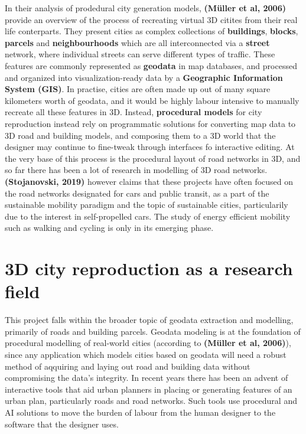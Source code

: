 \documentclass{kththesis}
\begin{document}
In their analysis of prodedural city generation models, \textbf{(Müller et al, 2006)} provide an overview of the process of recreating virtual 3D citites from their real life conterparts.
They present cities as complex collections of \textbf{buildings}, \textbf{blocks}, \textbf{parcels} and \textbf{neighbourhoods} which are all interconnected via a \textbf{street} network, where individual streets can serve different types of traffic.
These features are commonly represented as \textbf{geodata} in map databases, and processed and organized into visualization-ready data by a \textbf{Geographic Information System (GIS)}.
In practise, cities are often made up out of many square kilometers worth of geodata, and it would be highly labour intensive to manually recreate all these features in 3D.
Instead, \textbf{procedural models} for city reproduction instead rely on programmatic solutions for converting map data to 3D road and building models, and composing them to a 3D world that the designer may continue to fine-tweak through interfaces fo interactive editing.
At the very base of this process is the procedural layout of road networks in 3D, and so far there has been a lot of research in modelling of 3D road networks.
\textbf{(Stojanovski, 2019)} however claims that these projects have often focused on the road networks designated for cars and public transit, as a part of the sustainable mobility paradigm and the topic of sustainable cities, particularily due to the interest in self-propelled cars.
The study of energy efficient mobility such as walking and cycling is only in its emerging phase.

\section{3D city reproduction as a research field}

This project falls within the broader topic of geodata extraction and modelling, primarily of roads and building parcels.
Geodata modeling is at the foundation of procedural modelling of real-world cities (according to \textbf{(Müller et al, 2006)}), since any application which models cities based on geodata will need a robust method of aqquiring and laying out road and building data without compromising the data's integrity.
In recent years there has been an advent of interactive tools that aid urban planners in placing or generating features of an urban plan, particularly roads and road networks.
Such tools use procedural and AI solutions to move the burden of labour from the human designer to the software that the designer uses.
\end{document}

